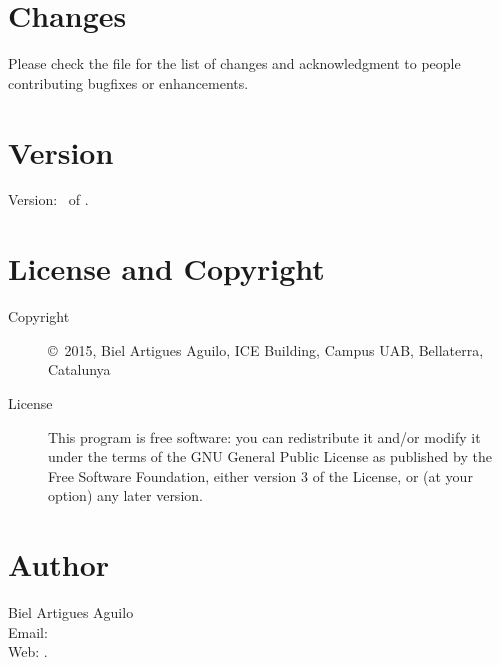 \documentclass[a4paper,english]{article}
\begin{document}
\section{Changes}
Please check the file  for the list of changes and
acknowledgment to people contributing bugfixes or enhancements.

\section{Version}

Version: \Version\ of \Date.

\section{License and Copyright}

\begin{description}
\item[Copyright] \copyright\ 2015, Biel Artigues Aguilo,
     ICE Building, Campus UAB, Bellaterra, Catalunya\\

\item[License] This program is free software: you can redistribute it and/or modify
    it under the terms of the GNU General Public License as published by
    the Free Software Foundation, either version 3 of the License, or
    (at your option) any later version.

\end{description}

\section{Author}

\noindent
Biel Artigues Aguilo                      \\
Email:   \\
Web: .

\LatexManEnd
\end{document}
